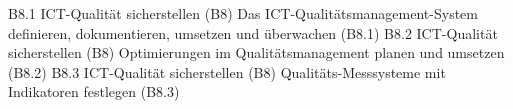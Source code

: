 \templateCard
  {B8.1}
  {ICT-Qualität sicherstellen (B8)}
  {Das ICT-Qualitätsmanagement-System definieren, dokumentieren, umsetzen und überwachen (B8.1)}
\templateCard
  {B8.2}
  {ICT-Qualität sicherstellen (B8)}
  {Optimierungen im Qualitätsmanagement planen und umsetzen (B8.2)}
\templateCard
  {B8.3}
  {ICT-Qualität sicherstellen (B8)}
  {Qualitäts-Messsysteme mit Indikatoren festlegen (B8.3)}
